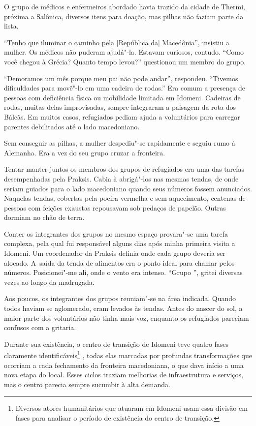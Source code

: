 O grupo de médicos e enfermeiros abordado havia trazido da cidade de
Thermi, próxima a Salônica, diversos itens para doação, mas pilhas não faziam parte da lista.

``Tenho que iluminar o caminho pela {[}República da{]} Macedônia'',
insistiu a mulher. Os médicos não puderam ajudá"-la. Estavam curiosos,
contudo. ``Como você chegou à Grécia? Quanto tempo levou?'' questionou
um membro do grupo.

``Demoramos um mês porque meu pai não pode andar'', respondeu.
``Tivemos dificuldades para movê"-lo em uma cadeira de rodas.''
 Era comum a presença de pessoas com deficiência física ou mobilidade limitada em Idomeni.
 Cadeiras de rodas, muitas delas improvisadas, sempre integraram a paisagem da rota dos Bálcãs. Em muitos
casos, refugiados pediam ajuda a voluntários para carregar parentes
debilitados até o lado macedoniano.

Sem conseguir as pilhas, a mulher despediu"-se rapidamente e seguiu rumo
à Alemanha. Era a vez do seu grupo cruzar a fronteira.

Tentar manter juntos os membros dos grupos de refugiados era uma das
tarefas desempenhadas pela Praksis. Cabia à  abrigá"-los nas mesmas
tendas, de onde seriam guiados para o lado macedoniano quando seus
números fossem anunciados. Naquelas tendas, cobertas pela poeira
vermelha e sem aquecimento, centenas de pessoas com feições exaustas
repousavam sob pedaços de papelão. Outras dormiam no chão de terra.

Conter os integrantes dos grupos no mesmo espaço provara"-se uma tarefa
complexa, pela qual fui responsável alguns dias após minha primeira
visita a Idomeni. Um coordenador da Praksis definia onde cada grupo
deveria ser alocado. A~saída da tenda de alimentos era o ponto ideal
para chamar pelos números. Posicionei"-me ali, onde o vento era intenso. ``Grupo '', gritei diversas vezes
ao longo da madrugada.

Aos poucos, os integrantes dos grupos reuniam"-se na área indicada.
Quando todos haviam se aglomerado, eram levados às tendas. Antes do
nascer do sol, a maior parte dos voluntários não tinha mais voz,
enquanto os refugiados pareciam confusos com a gritaria.

Durante sua existência, o centro de transição de Idomeni teve quatro
fases claramente identificáveis\footnote{ Diversos atores humanitários que atuaram em Idomeni
usam essa divisão em fases para analisar o período de existência do
centro de transição.} , todas elas marcadas
por profundas transformações que ocorriam a cada fechamento da fronteira
macedoniana, o que dava início a uma nova etapa do local. Esses ciclos
traziam melhorias de infraestrutura e serviços, mas o centro parecia
sempre sucumbir à alta demanda.

